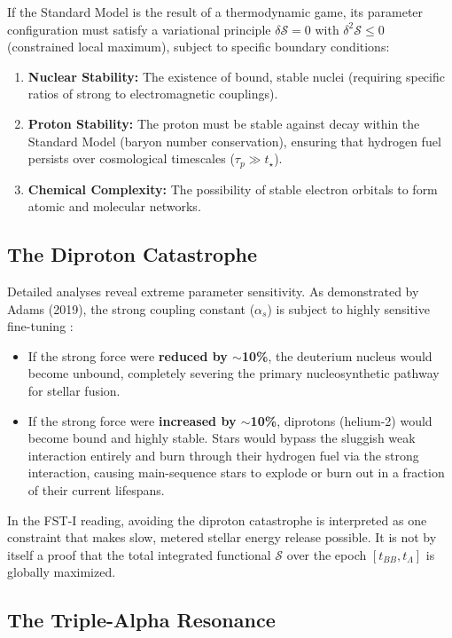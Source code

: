 \documentclass[12pt,a4paper]{article}
\theoremstyle{remark}
\begin{document}
If the Standard Model is the result of a thermodynamic game, its parameter configuration must satisfy a variational principle $\delta \mathcal{S} = 0$ with $\delta^2 \mathcal{S} \leq 0$ (constrained local maximum), subject to specific boundary conditions:
\begin{enumerate}
    \item \textbf{Nuclear Stability:} The existence of bound, stable nuclei (requiring specific ratios of strong to electromagnetic couplings).
    \item \textbf{Proton Stability:} The proton must be stable against decay within the Standard Model (baryon number conservation), ensuring that hydrogen fuel persists over cosmological timescales ($\tau_p \gg t_\star$).
    \item \textbf{Chemical Complexity:} The possibility of stable electron orbitals to form atomic and molecular networks.
\end{enumerate}

\subsection{The Diproton Catastrophe}

Detailed analyses reveal extreme parameter sensitivity. As demonstrated by Adams (2019), the strong coupling constant ($\alpha_s$) is subject to highly sensitive fine-tuning \citep{Adams2019}:

\begin{itemize}
    \item If the strong force were \textbf{reduced by $\sim$10\%}, the deuterium nucleus would become unbound, completely severing the primary nucleosynthetic pathway for stellar fusion.
    \item If the strong force were \textbf{increased by $\sim$10\%}, diprotons (helium-2) would become bound and highly stable. Stars would bypass the sluggish weak interaction entirely and burn through their hydrogen fuel via the strong interaction, causing main-sequence stars to explode or burn out in a fraction of their current lifespans.
\end{itemize}

In the FST-I reading, avoiding the diproton catastrophe is interpreted as one constraint that makes slow, metered stellar energy release possible. It is not by itself a proof that the total integrated functional $\mathcal{S}$ over the epoch $[t_{BB}, t_\Lambda]$ is globally maximized.

\subsection{The Triple-Alpha Resonance}
\end{document}

